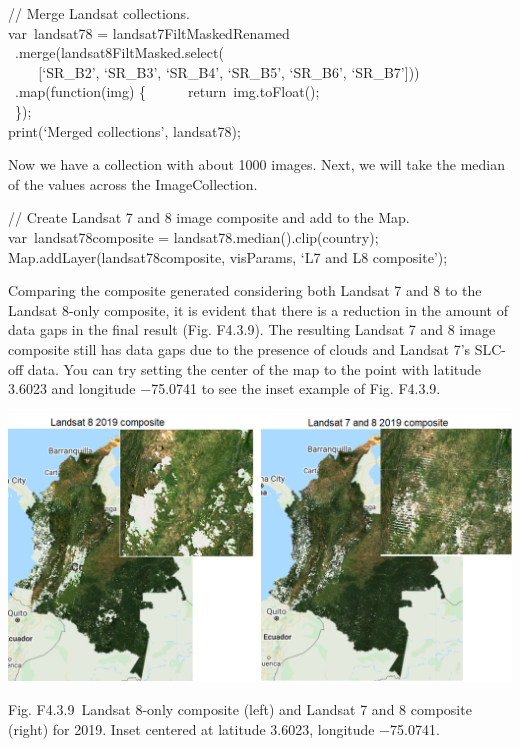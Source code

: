 \documentclass[
  letterpaper,
  DIV=11,
  numbers=noendperiod]{scrreprt}
\begin{document}
// Merge Landsat collections.\\
var~landsat78 = landsat7FiltMaskedRenamed\\
\hspace*{0.333em} ~.merge(landsat8FiltMasked.select(\\
\hspace*{0.333em} ~ ~ ~{[}`SR\_B2', `SR\_B3', `SR\_B4', `SR\_B5',
`SR\_B6', `SR\_B7'{]}))\\
\hspace*{0.333em} ~.map(function(img) \{~ ~ ~ ~return~img.toFloat();\\
\hspace*{0.333em} ~\});\\
print(`Merged collections', landsat78);

Now we have a collection with about 1000 images. Next, we will take the
median of the values across the ImageCollection.~

// Create Landsat 7 and 8 image composite and add to the Map.\\
var~landsat78composite = landsat78.median().clip(country);\\
Map.addLayer(landsat78composite, visParams, `L7 and L8 composite');

Comparing the composite generated considering both Landsat 7 and 8 to
the Landsat 8-only composite, it is evident that there is a reduction in
the amount of data gaps in the final result (Fig. F4.3.9). The resulting
Landsat 7 and 8 image composite still has data gaps due to the presence
of clouds and Landsat 7's SLC-off data. You can try setting the center
of the map to the point with latitude 3.6023 and longitude −75.0741 to
see the inset example of Fig. F4.3.9.

\includegraphics{./F4/image30.png}

Fig. F4.3.9~Landsat 8-only composite (left) and Landsat 7 and 8
composite (right) for 2019. Inset centered at latitude 3.6023, longitude
−75.0741.
\end{document}
